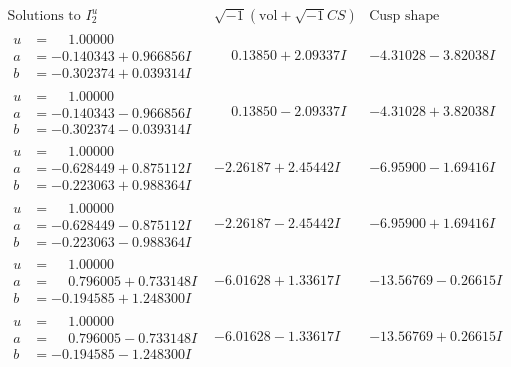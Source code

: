 \documentclass[1p]{elsarticle_modified}
\theoremstyle{definition}
\newcommand{\I}{\sqrt{-1}}
\begin{document}
$$\begin{array}{c|c|c}  
\text{Solutions to }I^u_{2}& \I (\text{vol} + \sqrt{-1}CS) & \text{Cusp shape}\\
 \hline 
\begin{aligned}
u &= \phantom{-}1.00000\phantom{ +0.000000I} \\
a &= -0.140343 + 0.966856 I \\
b &= -0.302374 + 0.039314 I\end{aligned}
 & \phantom{-}0.13850 + 2.09337 I & -4.31028 - 3.82038 I \\ \hline\begin{aligned}
u &= \phantom{-}1.00000\phantom{ +0.000000I} \\
a &= -0.140343 - 0.966856 I \\
b &= -0.302374 - 0.039314 I\end{aligned}
 & \phantom{-}0.13850 - 2.09337 I & -4.31028 + 3.82038 I \\ \hline\begin{aligned}
u &= \phantom{-}1.00000\phantom{ +0.000000I} \\
a &= -0.628449 + 0.875112 I \\
b &= -0.223063 + 0.988364 I\end{aligned}
 & -2.26187 + 2.45442 I & -6.95900 - 1.69416 I \\ \hline\begin{aligned}
u &= \phantom{-}1.00000\phantom{ +0.000000I} \\
a &= -0.628449 - 0.875112 I \\
b &= -0.223063 - 0.988364 I\end{aligned}
 & -2.26187 - 2.45442 I & -6.95900 + 1.69416 I \\ \hline\begin{aligned}
u &= \phantom{-}1.00000\phantom{ +0.000000I} \\
a &= \phantom{-}0.796005 + 0.733148 I \\
b &= -0.194585 + 1.248300 I\end{aligned}
 & -6.01628 + 1.33617 I & -13.56769 - 0.26615 I \\ \hline\begin{aligned}
u &= \phantom{-}1.00000\phantom{ +0.000000I} \\
a &= \phantom{-}0.796005 - 0.733148 I \\
b &= -0.194585 - 1.248300 I\end{aligned}
 & -6.01628 - 1.33617 I & -13.56769 + 0.26615 I \\ \hline\begin{aligned}

\end{aligned}
\end{array}$$
\end{document}

